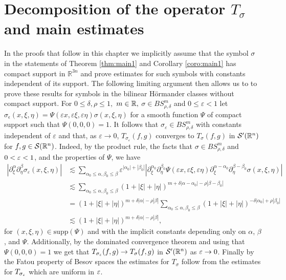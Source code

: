 \section{Decomposition of the operator $T_\sigma$ and main estimates}\label{sec:decomp}
In the proofs that follow in this chapter we implicitly assume that the symbol $\sigma$ in the statements of Theorem \ref{thm:main1} and Corollary \ref{coro:main1} has compact support in $\mathbb{R}^{3n}$ and prove estimates for such symbols with constants independent of its support. The following limiting argument then allows us to to prove these results for symbols in the bilinear H\"ormander classes without compact support. For $0\le \delta,\rho\le 1,$ $m\in\mathbb{R},$ $\sigma\in BS^m_{\rho,\delta}$ and $0\le \varepsilon<1$ let $\sigma_\epsilon (x,\xi,\eta) = \Psi(\varepsilon x, \varepsilon \xi, \varepsilon \eta) \sigma( x, \xi,\eta)$ for a smooth  function $\Psi$ of compact support such that $\Psi(0,0,0) = 1$. It follows that $\sigma_\varepsilon \in BS^m_{\rho,\delta}$ with constants independent of $\varepsilon$ and that, as $\varepsilon \rightarrow 0$, $T_{\sigma_\varepsilon}(f,g)$ converges to $T_\sigma(f,g)$ in ${\mathcal{S}'}({{\mathbb R}^n})$ for $f,g \in {\mathcal{S}}({{\mathbb R}^n})$. Indeed, by the product rule, the facts that $\sigma \in BS^m_{\rho,\delta}$ and $0<\varepsilon<1$, and the properties of $\Psi$, we have
\begin{align*}
|\partial^\alpha_\xi \partial^\beta_\eta \sigma_\varepsilon(x,\xi,\eta)| & 
\lesssim \sum_{\alpha_0 \leq \alpha, \beta_0 \leq \beta} \varepsilon^{|\alpha_0| + |\beta_0|}|\partial^{\alpha_0}_\xi \partial^{\beta_0}_\eta \Psi(\varepsilon x, \varepsilon \xi, \varepsilon \eta) \partial^{\alpha - \alpha_0}_\xi \partial^{\beta - \beta_0}_\eta \sigma(x,\xi,\eta) | \\
& \lesssim \sum_{\alpha_0 \leq \alpha, \beta_0 \leq \beta} (1 + |\xi| + |\eta|)^{m + \delta|\alpha - \alpha_0| - \rho|\beta - \beta_0|} \\
& =(1 + |\xi| + |\eta|)^{m + \delta|\alpha| - \rho|\beta|} \sum_{\alpha_0 \leq \alpha, \beta_0 \leq \beta} (1 + |\xi| + |\eta|)^{-\delta| \alpha_0| + \rho|\beta_0|} \\
& \lesssim (1 + |\xi| + |\eta|)^{m + \delta|\alpha| - \rho|\beta|},
\end{align*}
for $(x,\xi,\eta) \in \text{supp}(\Psi)$ and with the implicit constants depending only on $\alpha$, $\beta$, and $\Psi$. Additionally, by the dominated convergence theorem and using that  $\Psi(0,0,0) = 1$ we get that $T_{\sigma_\varepsilon}(f,g) \rightarrow T_\sigma(f,g)$ in ${\mathcal{S}'}({{\mathbb R}^n})$ as $\varepsilon \rightarrow 0$. Finally by the Fatou property of Besov spaces the estimates for $T_\sigma$ follow from the estimates for $T_{\sigma_\varepsilon}$ which are uniform in $\varepsilon$. 

